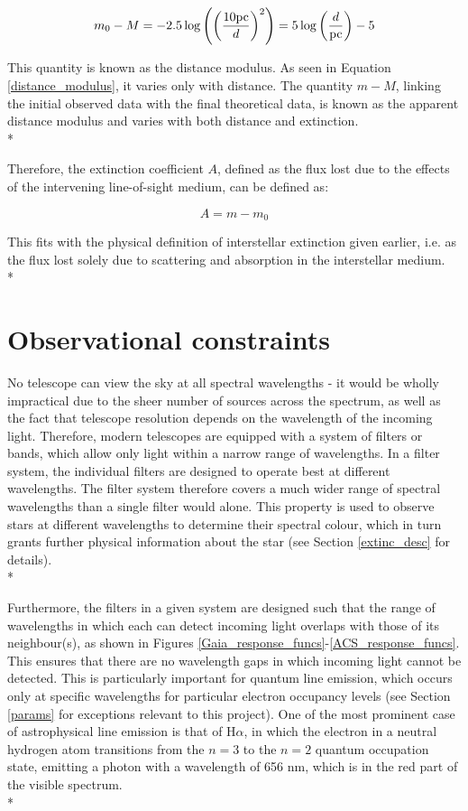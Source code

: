 \documentclass[12pt, a4paper]{report}
\begin{document}
\begin{equation}
\label{distance_modulus}
m_{0} - M = -2.5\log \left( \left(\frac{10\textnormal{pc}}{d}\right)^{2} \right) = 5\log\left(\frac{d}{\textnormal{pc}}\right) - 5
\end{equation}

This quantity is known as the distance modulus. As seen in Equation \ref{distance_modulus}, it varies only with distance. The quantity $m - M $, linking the initial observed data with the final theoretical data, is known as the apparent distance modulus and varies with both distance and extinction. \\*

Therefore, the extinction coefficient $A$, defined as the flux lost due to the effects of the intervening line-of-sight medium, can be defined as:

\begin{equation}
\label{bol_extinc}
A = m - m_{0}
\end{equation}

This fits with the physical definition of interstellar extinction given earlier, i.e. as the flux lost solely due to scattering and absorption in the interstellar medium. \\*

\section{Observational constraints}
No telescope can view the sky at all spectral wavelengths - it would be wholly impractical due to the sheer number of sources across the spectrum, as well as the fact that telescope resolution depends on the wavelength of the incoming light. Therefore, modern telescopes are equipped with a system of filters or bands, which allow only light within a narrow range of wavelengths. In a filter system, the individual filters are designed to operate best at different wavelengths. The filter system therefore covers a much wider range of spectral wavelengths than a single filter would alone. This property is used to observe stars at different wavelengths to determine their spectral colour, which in turn grants further physical information about the star (see Section \ref{extinc_desc} for details). \\*

Furthermore, the filters in a given system are designed such that the range of wavelengths in which each can detect incoming light overlaps with those of its neighbour(s), as shown in Figures \ref{Gaia_response_funcs}-\ref{ACS_response_funcs}. This ensures that there are no wavelength gaps in which incoming light cannot be detected. This is particularly important for quantum line emission, which occurs only at specific wavelengths for particular electron occupancy levels (see Section \ref{params} for exceptions relevant to this project). One of the most prominent case of astrophysical line emission is that of H$\alpha$, in which the electron in a neutral hydrogen atom transitions from the $n = 3$ to the $n = 2$ quantum occupation state, emitting a photon with a wavelength of 656 nm, which is in the red part of the visible spectrum. \\*
\end{document}
